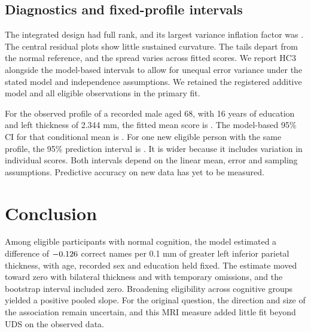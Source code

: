 \documentclass[11pt]{article}
\begin{document}

\clearpage
\subsection{Diagnostics and fixed-profile intervals}
The integrated design had full rank, and its largest variance inflation factor was \FinalVIF{}. The central residual plots show little sustained curvature. The tails depart from the normal reference, and the spread varies across fitted scores. We report HC3 alongside the model-based intervals to allow for unequal error variance under the stated model and independence assumptions. We retained the registered additive model and all eligible observations in the primary fit.


For the observed profile of a recorded male aged 68, with 16 years of education and left thickness of 2.344 mm, the fitted mean score is \ProfileMean{}. The model-based 95\% CI for that conditional mean is \ProfileMeanCI{}. For one new eligible person with the same profile, the 95\% prediction interval is \ProfileIndividualCI{}. It is wider because it includes variation in individual scores. Both intervals depend on the linear mean, error and sampling assumptions. Predictive accuracy on new data has yet to be measured.

\clearpage


\section{Conclusion}
Among eligible participants with normal cognition, the model estimated a difference of \(-0.126\) correct names per 0.1 mm of greater left inferior parietal thickness, with age, recorded sex and education held fixed. The estimate moved toward zero with bilateral thickness and with temporary omissions, and the bootstrap interval included zero. Broadening eligibility across cognitive groups yielded a positive pooled slope. For the original question, the direction and size of the association remain uncertain, and this MRI measure added little fit beyond UDS on the observed data.
\end{document}
